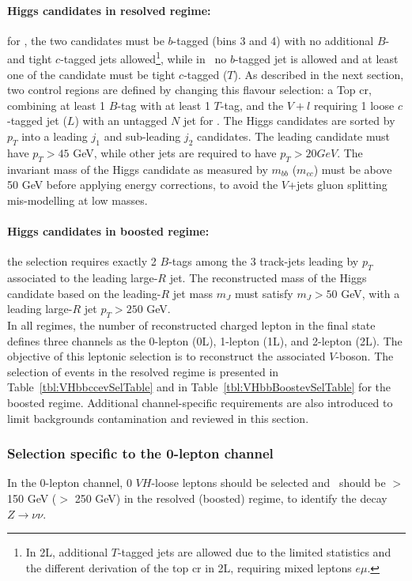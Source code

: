 \paragraph{Higgs candidates in resolved regime:} for \vhb, the two candidates must be $b$-tagged (bins 3 and 4) with no additional $B$- and tight $c$-tagged jets allowed\footnote{In 2L, additional $T$-tagged jets are allowed due to the limited statistics and the different derivation of the top \gls{cr} in 2L, requiring mixed leptons $e\mu$.}, while in \vhc\ no $b$-tagged jet is allowed and at least one of the candidate must be tight $c$-tagged ($T$). As described in the next section, two control regions are defined by changing this flavour selection: a Top \gls{cr}, combining at least 1 $B$-tag with at least 1 $T$-tag, and the $V+l$ requiring 1 loose $c$-tagged jet ($L$) with an untagged $N$ jet for \vhc. The Higgs candidates are sorted by $p_T$ into a leading $j_1$ and sub-leading $j_2$ candidates. The leading candidate must have $p_T > 45$ GeV, while other jets are required to have $p_T > 20 GeV$. The invariant mass of the Higgs candidate as measured by $m_{bb}$ ($m_{cc}$) must be above 50 GeV before applying energy corrections, to avoid the $V$+jets gluon splitting mis-modelling at low masses.  %
\paragraph{Higgs candidates in boosted regime:} the selection requires exactly 2 $B$-tags among the 3 track-jets leading by $p_T$ associated to the leading large-$R$ jet. The reconstructed mass of the Higgs candidate based on the leading-$R$ jet mass $m_J$ must satisfy $m_J > 50$ GeV, with a leading large-$R$ jet $p_T > 250$ GeV. \\

In all regimes, the number of reconstructed charged lepton in the final state defines three channels as the 0-lepton (0L), 1-lepton (1L), and 2-lepton (2L). The objective of this leptonic selection is to reconstruct the associated $V$-boson. The selection of events in the resolved regime is presented in Table~\ref{tbl:VHbbccevSelTable} and in Table~\ref{tbl:VHbbBoostevSelTable} for the boosted regime. Additional channel-specific requirements are also introduced to limit backgrounds contamination and reviewed in this section.

\subsubsection{Selection specific to the 0-lepton channel}\label{subsubsec-0Lsel}
In the 0-lepton channel, 0 $VH$-loose leptons should be selected and \etm\ should be $>$ 150 GeV ($>$ 250 GeV) in the resolved (boosted) regime, to identify the decay $Z \rightarrow \nu\nu$. \\ %
 
